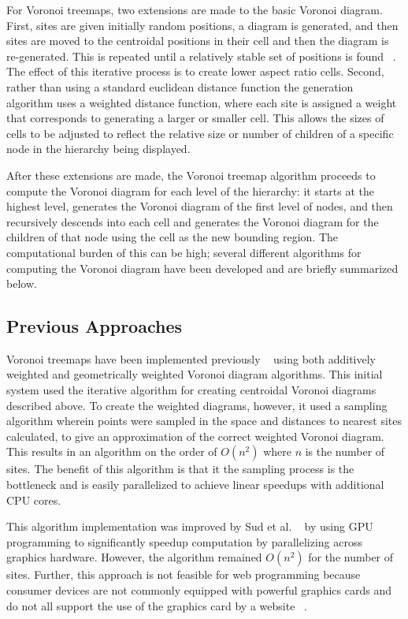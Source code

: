 \documentclass{acm_proc_article-sp}
\begin{document}
For Voronoi treemaps, two extensions are made to the basic Voronoi
diagram. First, sites are given initially random positions, a diagram
is generated, and then sites are moved to the centroidal positions in
their cell and then the diagram is re-generated. This is repeated
until a relatively stable set of positions is found ~\cite{lloyd}. The
effect of this iterative process is to create lower aspect ratio
cells. Second, rather than using a standard euclidean distance
function the generation algorithm uses a weighted distance function,
where each site is assigned a weight that corresponds to generating a
larger or smaller cell. This allows the sizes of cells to be adjusted
to reflect the relative size or number of children of a specific node
in the hierarchy being displayed.

After these extensions are made, the Voronoi treemap algorithm
proceeds to compute the Voronoi diagram for each level of the
hierarchy: it starts at the highest level, generates the Voronoi
diagram of the first level of nodes, and then recursively descends
into each cell and generates the Voronoi diagram for the children of
that node using the cell as the new bounding region. The computational
burden of this can be high; several different algorithms for computing
the Voronoi diagram have been developed and are briefly summarized
below.

\subsection{Previous Approaches}
Voronoi treemaps have been implemented previously
~\cite{balzer:treemaps} using both additively weighted and
geometrically weighted Voronoi diagram algorithms. This initial system
used the iterative algorithm for creating centroidal Voronoi
diagrams described above. To create the weighted diagrams, however, it
used a sampling algorithm wherein points were sampled in the space and
distances to nearest sites calculated, to give an approximation of the
correct weighted Voronoi diagram. This results in an algorithm on the
order of $O(n^2)$ where $n$ is the number of sites. The benefit of
this algorithm is that it the sampling process is the bottleneck and
is easily parallelized to achieve linear speedups with additional CPU
cores.

This algorithm implementation was improved by Sud et
al. ~\cite{sud:fast} by using GPU programming to significantly speedup
computation by parallelizing across graphics hardware. However, the
algorithm remained $O(n^2)$ for the number of sites. Further, this
approach is not feasible for web programming because consumer devices
are not commonly equipped with powerful graphics cards and do not all
support the use of the graphics card by a website ~\cite{needed}.
\end{document}
